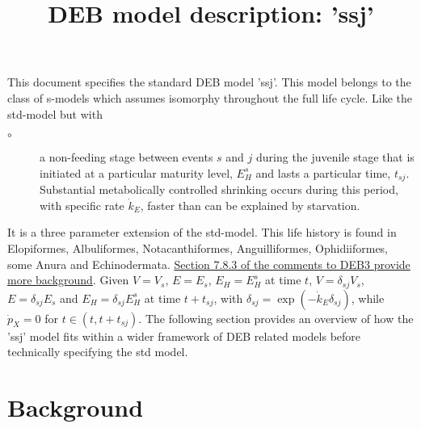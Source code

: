 \documentclass{article}
\title{DEB model description: 'ssj'}
\begin{document}
\maketitle

This document specifies the standard DEB model 'ssj'.
This model belongs to the class of s-models which assumes isomorphy throughout the full life cycle.
Like the std-model but with 
\begin{description}
   \item[$\circ$] a non-feeding stage between events $s$ and $j$ during the juvenile stage 
	    that is initiated at a particular maturity level, $E_H^s$ and lasts a particular time, $t_{sj}$.
      Substantial metabolically controlled shrinking occurs during this period, with specific rate $\dot{k}_E$, 
			faster than can be explained by starvation.  
\end{description}
It is a three parameter extension of the std-model.
This life history is found in Elopiformes, Albuliformes, Notacanthiformes, Anguilliformes, Ophidiiformes, some Anura and Echinodermata.
\href{https://www.bio.vu.nl/thb/deb/deblab/bib/Kooy2010_c.pdf}{Section 7.8.3 of the comments to DEB3 provide more background}.
Given $V = V_s$, $E = E_s$, $E_H = E_H^s$ at time $t$, $V = \delta_{sj} V_s$, $E = \delta_{sj} E_s$ and $E_H = \delta_{sj} E_H^s$ 
  at time $t + t_{sj}$, with $\delta_{sj} = \exp(- \dot{k}_E \delta_{sj})$, while $\dot{p}_X = 0$ for $t \in (t, t + t_{sj})$.
 The following section provides an overview of how the 'ssj' model fits within a wider framework of DEB related models before technically specifying the std model.

\section{Background}







\end{document}
